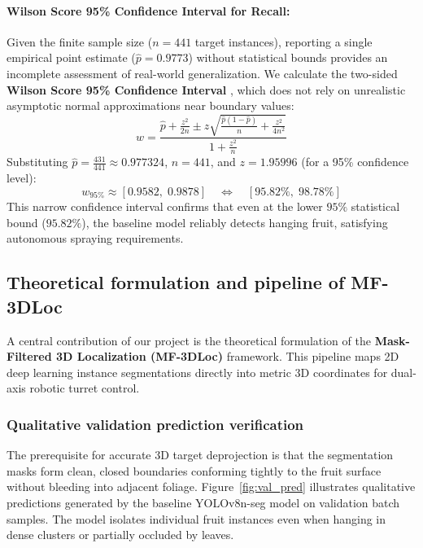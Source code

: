 \documentclass[12pt,a4paper]{article}
\begin{document}
\paragraph{Wilson Score 95\% Confidence Interval for Recall:}
Given the finite sample size ($n = 441$ target instances), reporting a single empirical point estimate ($\hat{p} = 0.9773$) without statistical bounds provides an incomplete assessment of real-world generalization. We calculate the two-sided \textbf{Wilson Score 95\% Confidence Interval} \cite{wilson1927probable}, which does not rely on unrealistic asymptotic normal approximations near boundary values:
\begin{equation}
w = \frac{\hat{p} + \frac{z^2}{2n} \pm z \sqrt{\frac{\hat{p}(1 - \hat{p})}{n} + \frac{z^2}{4n^2}}}{1 + \frac{z^2}{n}}
\label{eq:wilson_ci}
\end{equation}
Substituting $\hat{p} = \frac{431}{441} \approx 0.977324$, $n = 441$, and $z = 1.95996$ (for a 95\% confidence level):
\begin{equation}
w_{95\%} \approx [0.9582, \; 0.9878] \quad \Longleftrightarrow \quad [95.82\%, \; 98.78\%]
\end{equation}
This narrow confidence interval confirms that even at the lower $95\%$ statistical bound ($95.82\%$), the baseline model reliably detects hanging fruit, satisfying autonomous spraying requirements.

\subsection{Theoretical formulation and pipeline of MF-3DLoc}
\label{sec:mf_3dloc}
A central contribution of our project is the theoretical formulation of the \textbf{Mask-Filtered 3D Localization (MF-3DLoc)} framework. This pipeline maps 2D deep learning instance segmentations directly into metric 3D coordinates for dual-axis robotic turret control.

\subsubsection{Qualitative validation prediction verification}
The prerequisite for accurate 3D target deprojection is that the segmentation masks form clean, closed boundaries conforming tightly to the fruit surface without bleeding into adjacent foliage. Figure~\ref{fig:val_pred} illustrates qualitative predictions generated by the baseline YOLOv8n-seg model on validation batch samples. The model isolates individual fruit instances even when hanging in dense clusters or partially occluded by leaves.
\end{document}
